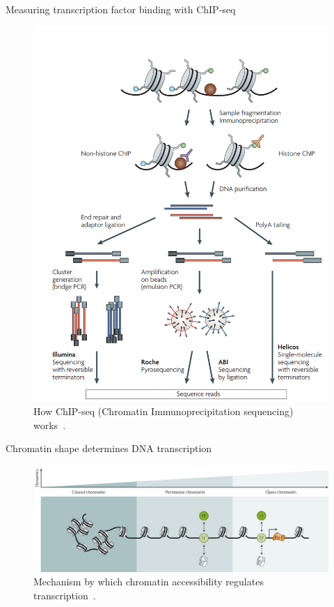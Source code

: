 \documentclass[pdf]{beamer} %
\begin{document}
\begin{frame}[t]{Measuring transcription factor binding with ChIP-seq}
    \begin{figure}[htpb]
        \centering
        \includegraphics[width=0.4\linewidth]{figures/tf_measurement}
        \caption{How ChIP-seq (Chromatin Immunoprecipitation sequencing) works~\cite{Park2009-im}.}
        \label{fig:tf_explanation}
    \end{figure} 
\end{frame}

\begin{frame}[t]{Chromatin shape determines DNA transcription}
    \begin{figure}[htpb]
        \centering
        \includegraphics[width=0.8\linewidth]{figures/chrom_acc_explanation}
        \caption{Mechanism by which chromatin accessibility regulates transcription~\cite{Klemm2019-hk}.}
        \label{fig:figures/chrom_acc_explanation}
    \end{figure} 
\end{frame}
\end{document}
